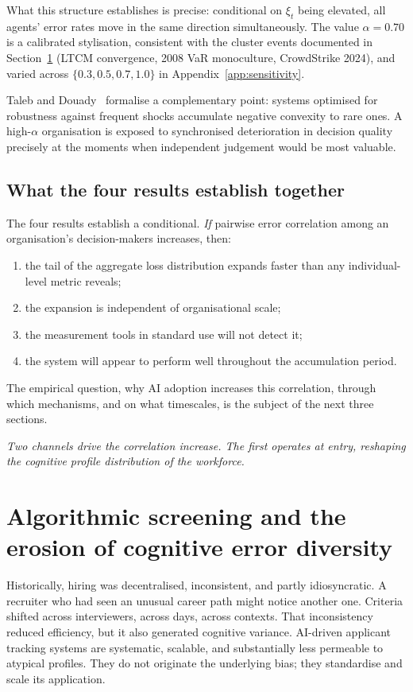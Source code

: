 \documentclass[11pt,a4paper]{article}
\newcommand{\bridgeskip}{\vspace{6pt}}
\begin{document}
What this structure establishes is precise: conditional on $\xi_t$ being
elevated, all agents' error rates move in the same direction simultaneously.
The value $\alpha = 0.70$ is a calibrated stylisation, consistent with the
cluster events documented in Section~\ref{sec:screening} (LTCM convergence,
2008 VaR monoculture, CrowdStrike 2024), and varied across $\{0.3, 0.5,
0.7, 1.0\}$ in Appendix~\ref{app:sensitivity}.

Taleb and Douady~\cite{taleb_qf_2013} formalise a complementary point:
systems optimised for robustness against frequent shocks accumulate negative
convexity to rare ones. A high-$\alpha$ organisation is exposed to
synchronised deterioration in decision quality precisely at the moments when
independent judgement would be most valuable.

\subsection{What the four results establish together}

The four results establish a conditional. \textit{If} pairwise error
correlation among an organisation's decision-makers increases, then:
\begin{enumerate}
  \item the tail of the aggregate loss distribution expands faster than any
        individual-level metric reveals;
  \item the expansion is independent of organisational scale;
  \item the measurement tools in standard use will not detect it;
  \item the system will appear to perform well throughout the accumulation
        period.
\end{enumerate}
The empirical question, why AI adoption increases this correlation, through
which mechanisms, and on what timescales, is the subject of the next three
sections.

\bridgeskip
\noindent\textit{Two channels drive the correlation increase. The first
operates at entry, reshaping the cognitive profile distribution of the
workforce.}

\section{Algorithmic screening and the erosion of cognitive error diversity}\label{sec:screening}

Historically, hiring was decentralised, inconsistent, and partly idiosyncratic.
A recruiter who had seen an unusual career path might notice another one.
Criteria shifted across interviewers, across days, across contexts. That
inconsistency reduced efficiency, but it also generated cognitive variance.
AI-driven applicant tracking systems are systematic, scalable, and
substantially less permeable to atypical profiles. They do not originate the
underlying bias; they standardise and scale its application.
\end{document}
